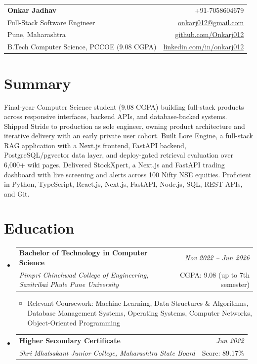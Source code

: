 \documentclass[a4paper,11pt]{article}
\makeatletter
\newcommand{\resumeSubheading}[4]{
\vspace{0.5mm}\item
    \begin{tabular*}{0.98\textwidth}[t]{l@{\extracolsep{\fill}}r}
        \textbf{#1} & \textit{\footnotesize{#4}} \\
        \textit{\footnotesize{#3}} & \footnotesize{#2}\\
    \end{tabular*}
    \vspace{-2.4mm}
}
\newcommand{\resumeSubHeadingListStart}{\begin{itemize}[leftmargin=*,labelsep=0mm]}
\newcommand{\resumeItemListStart}{\begin{justify}\begin{itemize}[leftmargin=3ex, rightmargin=2ex, noitemsep,labelsep=1.2mm,itemsep=0mm]\small}
\newcommand{\resumeSubHeadingListEnd}{\end{itemize}\vspace{2mm}}
\newcommand{\resumeItemListEnd}{\end{itemize}\end{justify}\vspace{-2mm}}
\newcommand{\name}{Onkar Jadhav}
\newcommand{\phone}{7058604679}
\newcommand{\emaila}{onkarj012@gmail.com}
\newcommand{\github}{github.com/Onkarj012}
\newcommand{\linkedin}{linkedin.com/in/onkarj012}
\makeatother
\begin{document}
\selectfont

\begin{tabularx}{\linewidth}{L r}
  \textbf{\Large \name} & {+91-\phone} \\
  {Full-Stack Software Engineer} & \href{mailto:\emaila}{\emaila} \\
  {Pune, Maharashtra} & \href{https://\github}{\github} \\
  {B.Tech Computer Science, PCCOE (9.08 CGPA)} & \href{https://\linkedin}{\linkedin}
\end{tabularx}
\vspace{-4mm}

\section{\textbf{Summary}}
\vspace{1mm}
\small{
Final-year Computer Science student (9.08 CGPA) building full-stack products across responsive interfaces, backend APIs, and database-backed systems. Shipped Stride to production as sole engineer, owning product architecture and iterative delivery with an early private user cohort. Built Lore Engine, a full-stack RAG application with a Next.js frontend, FastAPI backend, PostgreSQL/pgvector data layer, and deploy-gated retrieval evaluation over 6,000+ wiki pages. Delivered StockXpert, a Next.js and FastAPI trading dashboard with live screening and alerts across 100 Nifty NSE equities. Proficient in Python, TypeScript, React.js, Next.js, FastAPI, Node.js, SQL, REST APIs, and Git.
}
\vspace{-3mm}

\section{\textbf{Education}}
  \resumeSubHeadingListStart
    \resumeSubheading
      {Bachelor of Technology in Computer Science}{CGPA: 9.08 (up to 7th semester)}
      {Pimpri Chinchwad College of Engineering, Savitribai Phule Pune University}{Nov 2022 -- Jun 2026}
      \resumeItemListStart
        \item {Relevant Coursework: Machine Learning, Data Structures \& Algorithms, Database Management Systems, Operating Systems, Computer Networks, Object-Oriented Programming}
      \resumeItemListEnd
    \resumeSubheading
      {Higher Secondary Certificate}{Score: 89.17\%}
      {Shri Mhalsakant Junior College, Maharashtra State Board}{Jun 2022}
  \resumeSubHeadingListEnd
\vspace{-5.5mm}
\end{document}

